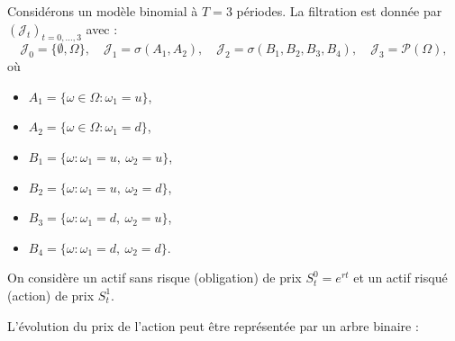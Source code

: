 \documentclass[12pt,a4paper]{article}
\numberwithin{equation}{section}
\theoremstyle{plain} %
\theoremstyle{definition} %
\theoremstyle{remark} %
\theoremstyle{myexample}
\theoremstyle{definition}
\begin{document}
Considérons un modèle binomial à $T=3$ périodes.  
La filtration est donnée par $(\mathcal{J}_t)_{t=0,\dots,3}$ avec :
\[
\mathcal{J}_0=\{\emptyset,\Omega\},\quad
\mathcal{J}_1=\sigma(A_1,A_2),\quad
\mathcal{J}_2=\sigma(B_1,B_2,B_3,B_4),\quad
\mathcal{J}_3=\mathcal{P}(\Omega),
\]
où
\begin{itemize}
    \item $A_1 = \{\omega \in \Omega : \omega_1 = u\}$,
    \item $A_2 = \{\omega \in \Omega : \omega_1 = d\}$,
    \item $B_1 = \{\omega : \omega_1 = u,\ \omega_2 = u\}$,
    \item $B_2 = \{\omega : \omega_1 = u,\ \omega_2 = d\}$,
    \item $B_3 = \{\omega : \omega_1 = d,\ \omega_2 = u\}$,
    \item $B_4 = \{\omega : \omega_1 = d,\ \omega_2 = d\}$.
\end{itemize}

On considère un actif sans risque (obligation) de prix $S_t^0 = e^{rt}$  
et un actif risqué (action) de prix $S_t^1$.

L’évolution du prix de l’action peut être représentée par un arbre binaire :
\end{document}
